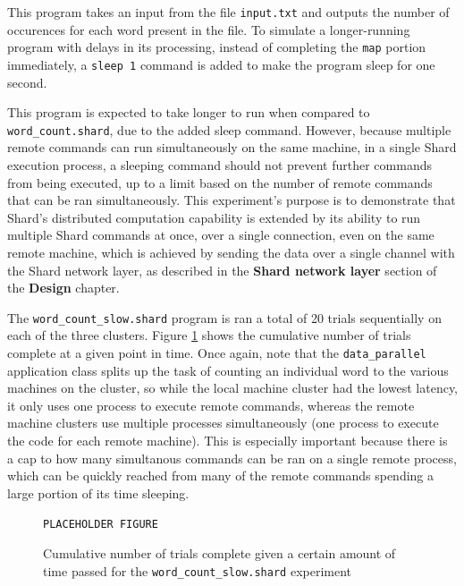 \documentclass[twoside]{report}
\begin{document}
This program takes an input from the file \texttt{input.txt} and outputs the number of occurences for each word present in the file.
To simulate a longer-running program with delays in its processing, instead of completing the \texttt{map} portion immediately, a \texttt{sleep 1} command is added to make the program sleep for one second.

This program is expected to take longer to run when compared to \texttt{word\_count.shard}, due to the added sleep command.
However, because multiple remote commands can run simultaneously on the same machine, in a single Shard execution process, a sleeping command should not prevent further commands from being executed, up to a limit based on the number of remote commands that can be ran simultaneously.
This experiment's purpose is to demonstrate that Shard's distributed computation capability is extended by its ability to run multiple Shard commands at once, over a single connection, even on the same remote machine, which is achieved by sending the data over a single channel with the Shard network layer, as described in the \textbf{Shard network layer} section of the \textbf{Design} chapter.

The \texttt{word\_count\_slow.shard} program is ran a total of 20 trials sequentially on each of the three clusters. Figure \ref{fig:wordcountslow} shows the cumulative number of trials complete at a given point in time. Once again, note that the \texttt{data\_parallel} application class splits up the task of counting an individual word to the various machines on the cluster, so while the local machine cluster had the lowest latency, it only uses one process to execute remote commands, whereas the remote machine clusters use multiple processes simultaneously (one process to execute the code for each remote machine). This is especially important because there is a cap to how many simultanous commands can be ran on a single remote process, which can be quickly reached from many of the remote commands spending a large portion of its time sleeping.

\begin{figure}[h]
  \begin{center}
    \vspace{2cm}
    \texttt{PLACEHOLDER FIGURE}
    \vspace{2cm}
    \caption{Cumulative number of trials complete given a certain amount of time passed for the \texttt{word\_count\_slow.shard} experiment}
    \label{fig:wordcountslow}
  \end{center}
\end{figure}
\end{document}
